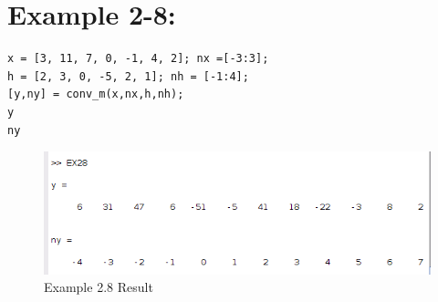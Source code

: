 \documentclass[11pt
  , a4paper
  , article
  , oneside
]{memoir}
\begin{document}
\chapter{Example 2-8:}
\begin{lstlisting}[style=termstyle]
x = [3, 11, 7, 0, -1, 4, 2]; nx =[-3:3];
h = [2, 3, 0, -5, 2, 1]; nh = [-1:4];
[y,ny] = conv_m(x,nx,h,nh);
y
ny
\end{lstlisting}
\begin{figure}[h!]
	\centering
	\includegraphics{./images/ex2-8.png}
	\caption{Example 2.8 Result}
	\label{fig:Example 2.8 Result} 
\end{figure}
\end{document}
